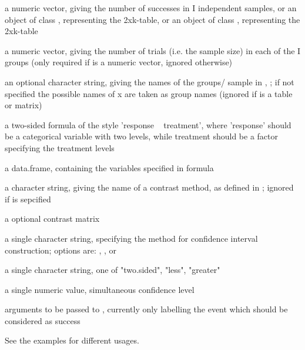 \begin{Arguments}
\begin{ldescription}
\item[\code{x}] a numeric vector, giving the number of successes in I independent samples,
or an object of class , representing the 2xk-table,
or an object of class , representing the 2xk-table

\item[\code{n}] a numeric vector, giving the number of trials (i.e. the sample size) in each of the I groups
(only required if  is a numeric vector, ignored otherwise) 
\item[\code{names}] an optional character string, giving the names of the groups/ sample in , ;
if not specified the possible names of x are taken as group names (ignored if  is a table or matrix)
\item[\code{formula}] a two-sided formula of the style 'response ~ treatment', where 'response' should be a categorical variable with two levels,
while treatment should be a factor specifying the treatment levels
\item[\code{data}] a data.frame, containing the variables specified in formula
\item[\code{type}] a character string, giving the name of a contrast method,
as defined in ; ignored if  is sepcified 
\item[\code{cmat}] a optional contrast matrix 
\item[\code{method}] a single character string, specifying the method for confidence interval construction; options are: , , or  
\item[\code{alternative}] a single character string, one of "two.sided", "less", "greater" 
\item[\code{conf.level}] a single numeric value, simultaneous confidence level 
\item[\code{...}] arguments to be passed to , currently only  labelling the event which should be considered as success
\end{ldescription}
\end{Arguments}
\begin{Details}\relax
See the examples for different usages.
\end{Details}
